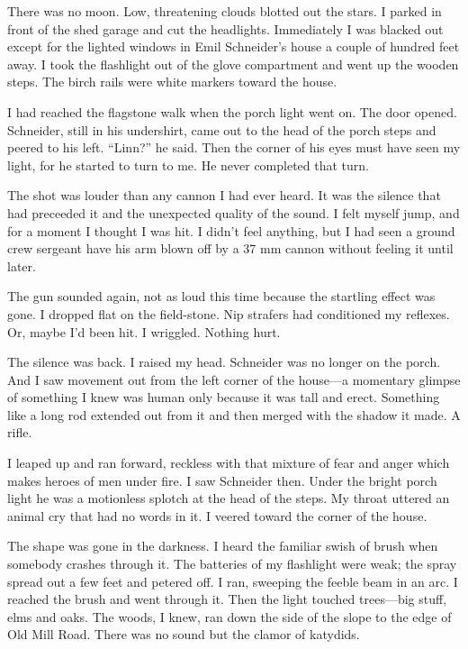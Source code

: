 {There was no moon. Low, threatening clouds blotted out the stars. I parked in front of the shed garage and cut the headlights. Immediately I was blacked out except for the lighted windows in Emil Schneider’s house a couple of hundred feet away. I took the flashlight out of the glove compartment and went up the wooden steps. The birch rails were white markers toward the house.

I had reached the flagstone walk when the porch light went on. The door opened. Schneider, still in his undershirt, came out to the head of the porch steps and peered to his left. “Linn?” he said. Then the corner of his eyes must have seen my light, for he started to turn to me. He never completed that turn.

The shot was louder than any cannon I had ever heard. It was the silence that had preceeded it and the unexpected quality of the sound. I felt myself jump, and for a moment I thought I was hit. I didn’t feel anything, but I had seen a ground crew sergeant have his arm blown off by a 37 mm cannon without feeling it until later.

The gun sounded again, not as loud this time because the startling effect was gone. I dropped flat on the field-stone. Nip strafers had conditioned my reflexes. Or, maybe I’d been hit. I wriggled. Nothing hurt.

The silence was back. I raised my head. Schneider was no longer on the porch. And I saw movement out from the left corner of the house—a momentary glimpse of something I knew was human only because it was tall and erect. Something like a long rod extended out from it and then merged with the shadow it made. A rifle.

I leaped up and ran forward, reckless with that mixture of fear and anger which makes heroes of men under fire. I saw Schneider then. Under the bright porch light he was a motionless splotch at the head of the steps. My throat uttered an animal cry that had no words in it. I veered toward the corner of the house.

The shape was gone in the darkness. I heard the familiar swish of brush when somebody crashes through it. The batteries of my flashlight were weak; the spray spread out a few feet and petered off. I ran, sweeping the feeble beam in an arc. I reached the brush and went through it. Then the light touched trees—big stuff, elms and oaks. The woods, I knew, ran down the side of the slope to the edge of Old Mill Road. There was no sound but the clamor of katydids.

}
